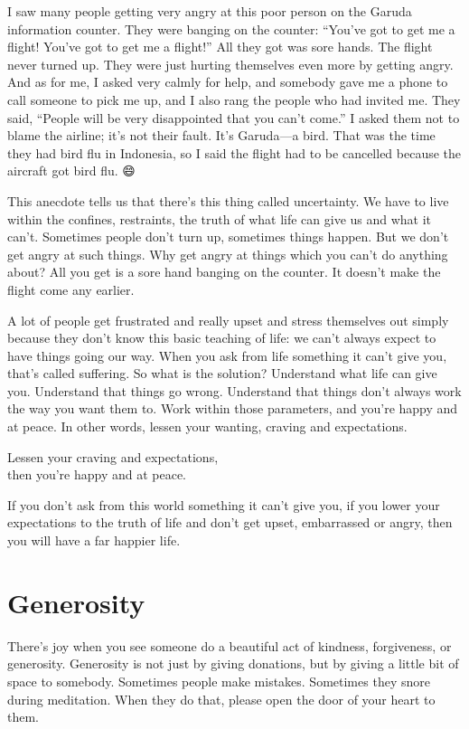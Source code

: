 \documentclass[12pt, openany]{book}
\newenvironment{aphorism}%
{%
\begin{center}\begin{itshape}
}%
{\end{itshape}\end{center}
}%
\begin{document}
I saw many people getting very angry at this poor person on the Garuda information counter. They were banging on the counter: “You’ve got to get me a flight! You’ve got to get me a flight!” All they got was sore hands. The flight never turned up. They were just hurting themselves even more by getting angry. And as for me, I asked very calmly for help, and somebody gave me a phone to call someone to pick me up, and I also rang the people who had invited me. They said, “People will be very disappointed that you can’t come.” I asked them not to blame the airline; it’s not their fault. It’s Garuda—a bird. That was the time they had bird flu in Indonesia, so I said the flight had to be cancelled because the aircraft got bird flu. 😄

This anecdote tells us that there’s this thing called uncertainty. We have to live within the confines, restraints, the truth of what life can give us and what it can’t. Sometimes people don’t turn up, sometimes things happen. But we don’t get angry at such things. Why get angry at things which you can’t do anything about? All you get is a sore hand banging on the counter. It doesn’t make the flight come any earlier. 

A lot of people get frustrated and really upset and stress themselves out simply because they don’t know this basic teaching of life: we can’t always expect to have things going our way. When you ask from life something it can’t give you, that’s called suffering. So what is the solution? Understand what life can give you. Understand that things go wrong. Understand that things don’t always work the way you want them to. Work within those parameters, and you’re happy and at peace. In other words, lessen your wanting, craving and expectations. 

\begin{aphorism}
Lessen your craving and expectations,\\  
then you’re happy and at peace.
\end{aphorism}

If you don’t ask from this world something it can’t give you, if you lower your expectations to the truth of life and don’t get upset, embarrassed or angry, then you will have a far happier life. 

\section*{Generosity}

There’s joy when you see someone do a beautiful act of kindness, forgiveness, or generosity. Generosity is not just by giving donations, but by giving a little bit of space to somebody. Sometimes people make mistakes. Sometimes they snore during meditation. When they do that, please open the door of your heart to them. 
\end{document}
